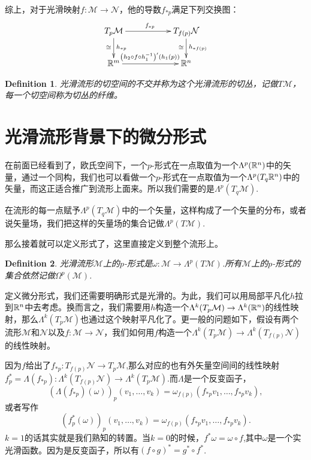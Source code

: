 \documentclass[8pt]{book}
\theoremstyle{plain}%
\newtheorem{defi}{Definition}[section]%
\begin{document}
综上，对于光滑映射$f:\mathcal{M}\to \mathcal{N}$，他的导数$f_{*p}$满足下列交换图：
	\[
		\xymatrix{
T_{p}\mathcal{M}\ar[d]_\cong^{h_{*p}}\ar[rr]^{f_{*p}}&&T_{f(p)}\mathcal{N}\ar[d]_\cong^{h_{*f(p)}}\\
		\rr^m\ar[rr]^{\left(h_2\circ f\circ h_1^{-1}\right)'(h_1(p))}&&\rr^n
		}
	\]
\begin{defi}
光滑流形的切空间的不交并称为这个光滑流形的切丛，记做$T\mathcal{M}$，每一个切空间称为切丛的纤维。
\end{defi}
\section{光滑流形背景下的微分形式}
在前面已经看到了，欧氏空间下，一个$p$-形式在一点取值为一个$\Lambda^p(\mathbb{R}^n)$中的矢量，通过一个同构，我们也可以看做一个$p$-形式在一点取值为一个$\Lambda^p(T_q\mathbb{R}^n)$中的矢量，而这正适合推广到流形上面来。所以我们需要的是$\Lambda^p(T_q\mathcal{M})$.

在流形的每一点赋予$\Lambda^p(T_q\mathcal{M})$中的一个矢量，这样构成了一个矢量的分布，或者说矢量场，我们把这样的矢量场的集合记做$\Lambda^p(T\mathcal{M})$.

那么接着就可以定义形式了，这里直接定义到整个流形上。
\begin{defi}
光滑流形$\mathcal{M}$上的$p$-形式是$\omega:\mathcal{M} \to \Lambda^p(T\mathcal{M})$.所有$\mathcal{M}$上的$p$-形式的集合依然记做$\Omega^p(\mathcal{M})$.
\end{defi}
定义微分形式，我们还需要明确形式是光滑的。为此，我们可以用局部平凡化$h$拉到$\mathbb{R}^n$中去考虑。换而言之，我们需要用$h$构造一个$\Lambda^k(T_p\mathcal{M})\to\Lambda^k(\mathbb{R}^n)$的线性映射，那么$\Lambda^k(T_p\mathcal{M})$也通过这个映射平凡化了。更一般的问题如下，假设有两个流形$\mathcal{M}$和$\mathcal{N}$以及$f:\mathcal{M}\to \mathcal{N}$，我们如何用$f$构造一个$\Lambda^k(T_p\mathcal{M}) \to \Lambda^k(T_{f(p)}\mathcal{N})$的线性映射。

因为$f$给出了$f_{*p}:T_{f(p)}\mathcal{N}\to T_{p}\mathcal{M}$,那么对应的也有外矢量空间间的线性映射
$f^*_{p}=\Lambda\left(f_{*p}\right):\Lambda^k\left(T_{f(p)}\mathcal{N}\right)\to \Lambda^k\left(T_{p}\mathcal{M}\right)$.而$\Lambda$是一个反变函子，
\[
(\Lambda\left(f_{*p}\right)\left(\omega\right))_p(v_1,\dots,v_k)=\omega_{f(p)}\left(f_{*p}v_1,\dots,f_{*p}v_k\right),
\]
或者写作
\[
(f_{p}^*\left(\omega\right))_p(v_1,\dots,v_k)=\omega_{f(p)}\left(f_{*p}v_1,\dots,f_{*p}v_k\right).
\]
$k=1$的话其实就是我们熟知的转置。当$k=0$的时候，$f^*\omega=\omega\circ f$,其中$\omega$是一个实光滑函数。因为是反变函子，所以有$(f\circ g)^*=g^*\circ f^*$.
\end{document}

